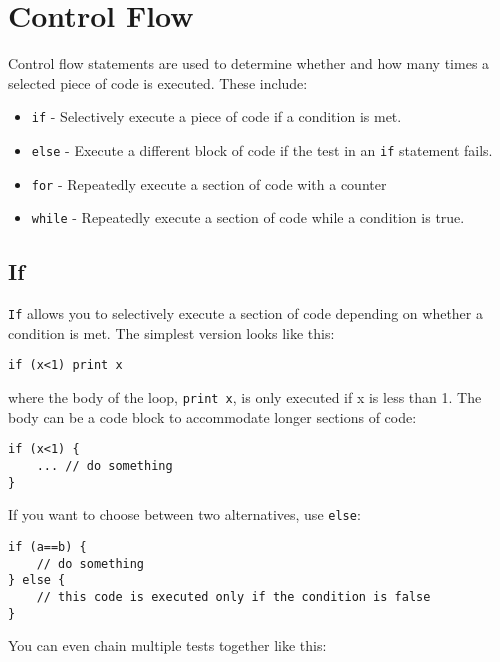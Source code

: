 \hypertarget{control-flow}{%
\section{Control Flow}\label{control-flow}}

Control flow statements are used to determine whether and how many times
a selected piece of code is executed. These include:

\begin{itemize}

\item
  \texttt{if} - Selectively execute a piece of code if a condition is
  met.
\item
  \texttt{else} - Execute a different block of code if the test in an
  \texttt{if} statement fails.
\item
  \texttt{for} - Repeatedly execute a section of code with a counter
\item
  \texttt{while} - Repeatedly execute a section of code while a
  condition is true.
\end{itemize}

\hypertarget{if}{%
\subsection{If}\label{if}}

\texttt{If} allows you to selectively execute a section of code
depending on whether a condition is met. The simplest version looks like
this:

\begin{lstlisting}
if (x<1) print x
\end{lstlisting}

where the body of the loop, \texttt{print\ x}, is only executed if x is
less than 1. The body can be a code block to accommodate longer sections
of code:

\begin{lstlisting}
if (x<1) {
    ... // do something
}
\end{lstlisting}

If you want to choose between two alternatives, use \texttt{else}:

\begin{lstlisting}
if (a==b) {
    // do something
} else {
    // this code is executed only if the condition is false
}
\end{lstlisting}

You can even chain multiple tests together like this:


